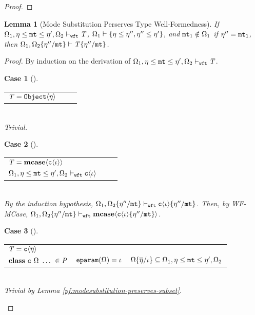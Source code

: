 \documentclass[onecolumn,nocopyrightspace]{sigplanconf}
\newtheorem{lemma}{Lemma}
\theoremstyle{lessintrusive}
\theoremstyle{plain}
\theoremstyle{custom}
\newtheorem*{case}{Case}
\theoremstyle{subcase-custom}
\def\econsexp#1#2#3{#1\msub#2\msub#3}
\begin{document}
\begin{proof}
\end{proof} 

\begin{lemma}[Mode Substitution Perserves Type Well-Formedness]
\label{pf:modesubstitution-preserves-wellformedness}
If $\espec_{1},\econsexp{\basemode}{\mtvar}{\basemode'},\espec_{2} \judgewft \bt$, $\Omega_{1} \vdash \{\eta\leq\eta'',\eta''\leq\eta'\}$, and $\mathtt{mt}_{1} \notin \Omega_{1}$ if $\eta'' = \mathtt{mt}_{1}$, then $\Omega_{1},\Omega_{2}\{\eta''/\mathtt{mt}\} \vdash \mathit{T}\{\eta''/\mathtt{mt}\}$.
\end{lemma}

\begin{proof}
By induction on the derivation of $\espec_{1},\basemode\msub\mtvar\msub\basemode',\espec_{2} \judgewft \bt$.
\begin{case}[]
\begin{tabular}[t]{>{$}l<{$} >{$}l<{$} >{$}l<{$}}
\bt = \Nobject\lb\basemode\rb & & \\
\end{tabular}\\ 
Trivial.
\end{case}

\begin{case}[] 
\begin{tabular}[t]{>{$}l<{$} >{$}l<{$} >{$}l<{$}}
\bt = \tmcase{\classiota} & & \\
\espec_{1},\econsexp{\basemode}{\mtvar}{\basemode'},\espec_{2} \judgewft \classiota & & \\
\end{tabular}\\ 
By the induction hypothesis, $\espec_{1},\espec_{2}\subst{\mtvar}{\basemode''} \judgewft \classiota\subst{\mtvar}{\basemode''}$. Then, by WF-MCase, $\espec_{1},\espec_{2}\subst{\mtvar}{\basemode''} \judgewft \tmcase{\classiota\subst{\mtvar}{\basemode''}}$.
\end{case}

\begin{case}[] 
\begin{tabular}[t]{>{$}l<{$} >{$}l<{$} >{$}l<{$}}
\bt = \Cname\lb\overline{\basemode}\rb & & \\
\kwclass\ \Cname\ \espec\ \dots\ \in \programcode & \Feparam(\espec) = \listi & \espec\subst{\listi}{\overline{\basemode}} \subseteq \espec_{1},\econsexp{\basemode}{\mtvar}{\basemode'},\espec_{2} \\
\end{tabular}\\
Trivial by Lemma \ref{pf:modesubstitution-preserves-subset}.
\end{case} 


\end{proof}
\end{document}
